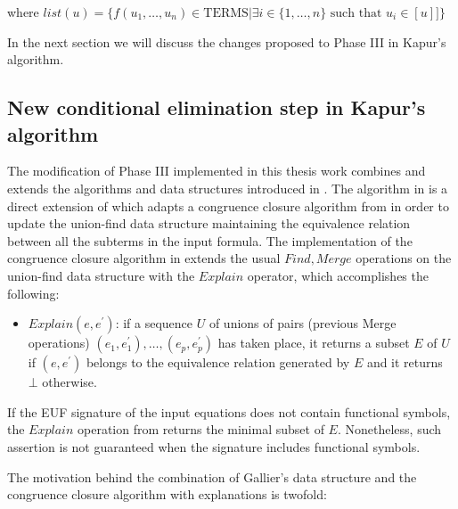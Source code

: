 where $list(u) = \{ f(u_1, \dots, u_n) \in \text{TERMS} 
| \exists i \in \{1, \dots, n\} \text{ such that } u_i \in [u] ] \}$

In the next section we will discuss the changes proposed to 
Phase III in Kapur's algorithm. 

\subsection{New conditional elimination 
step in Kapur's algorithm}

The modification of Phase III implemented in this thesis work
combines and extends the algorithms and data structures introduced
in \cite{GALLIER1987233, 10.1007/978-3-540-32033-3_33}.
The algorithm in \cite{GALLIER1987233} is a direct
extension of \cite{DOWLING1984267} which adapts a 
congruence closure algorithm from 
\cite{10.1145/322186.322198, 10.1145/322217.322228} in order
to update the union-find data structure maintaining the
equivalence relation between all the subterms in the input
formula. The implementation of the congruence closure
algorithm in \cite{10.1007/978-3-540-32033-3_33}
extends the usual $Find, Merge$ operations on the 
union-find data structure with the $Explain$ operator, 
which accomplishes the following:

\begin{itemize} \label{explain_def}
  \item[] $Explain(e, e^{'})$: if a sequence $U$ of
    unions of pairs (previous Merge operations) 
    $(e_1, e_1^{'}), \dots, (e_p, e_p^{'})$
    has taken place, it returns a subset $E$
    of $U$ if $(e, e^{'})$ belongs to the equivalence
    relation generated by $E$ and it returns $\bot$
    otherwise.
\end{itemize}

If the EUF signature of the input 
equations does not contain functional symbols, 
the $Explain$ operation from \cite{10.1007/978-3-540-32033-3_33} 
returns the minimal subset of $E$. Nonetheless, such
assertion is not guaranteed when the signature
includes functional symbols.

The motivation behind the combination of 
Gallier's data structure and the congruence 
closure algorithm with explanations is twofold: 

